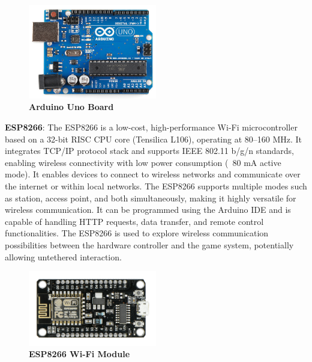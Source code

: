\begin{figure}[htbp!]
\centering
\includegraphics[width=0.5\textwidth]{images/fig3.2.png}
\caption{\textbf{Arduino Uno Board}}
\label{fig:3.2}
\end{figure}

\vspace{1.5\baselineskip} %

\textbf{ESP8266}: The ESP8266 is a low-cost, high-performance Wi-Fi microcontroller based on a 32-bit RISC CPU core (Tensilica L106), operating at 80–160 MHz. It integrates TCP/IP protocol stack and supports IEEE 802.11 b/g/n standards, enabling wireless connectivity with low power consumption (~80 mA active mode). It enables devices to connect to wireless networks and communicate over the internet or within local networks. The ESP8266 supports multiple modes such as station, access point, and both simultaneously, making it highly versatile for wireless communication. It can be programmed using the Arduino IDE and is capable of handling HTTP requests, data transfer, and remote control functionalities. The ESP8266 is used to explore wireless communication possibilities between the hardware controller and the game system, potentially allowing untethered interaction.

\begin{figure}[htbp!]
\centering
\includegraphics[width=0.5\textwidth]{images/fig3.3.jpg}
\caption{\textbf{ESP8266 Wi-Fi Module}}
\label{fig:3.3}
\end{figure}

\vspace{1.5\baselineskip} %

